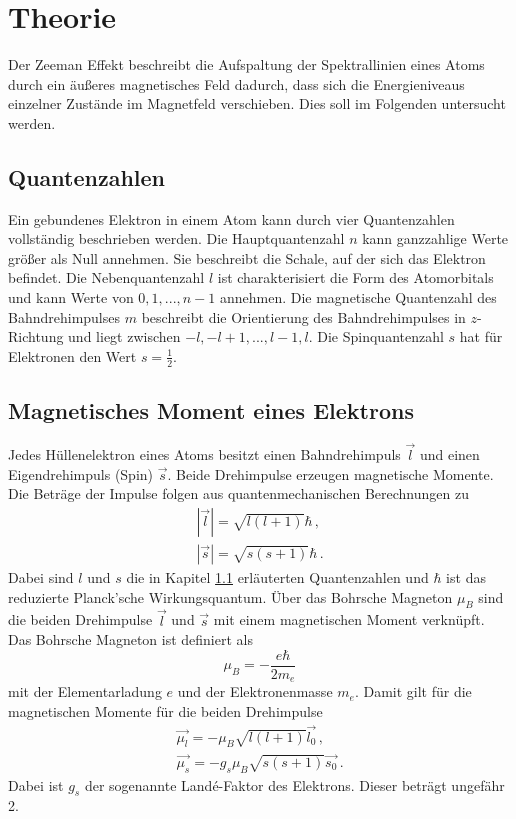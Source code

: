\section{Theorie}
\label{sec:theorie}
Der Zeeman Effekt beschreibt die Aufspaltung der Spektrallinien eines Atoms
durch ein äußeres magnetisches Feld dadurch, dass sich die Energieniveaus einzelner
Zustände im Magnetfeld verschieben. Dies soll im Folgenden untersucht werden.

\subsection{Quantenzahlen}
\label{subsec:quanten}

Ein gebundenes Elektron in einem Atom kann durch vier Quantenzahlen vollständig beschrieben werden.
Die Hauptquantenzahl $n$ kann ganzzahlige Werte größer als Null annehmen. Sie beschreibt die Schale, auf der sich das Elektron befindet. Die Nebenquantenzahl
$l$ ist charakterisiert die Form des Atomorbitals und kann Werte von $0,1,...,n-1$ annehmen. Die magnetische Quantenzahl des Bahndrehimpulses
$m$ beschreibt die Orientierung des Bahndrehimpulses in $z$-Richtung und liegt zwischen $-l, -l+1,..., l-1, l$.
Die Spinquantenzahl $s$ hat für
Elektronen den Wert $s=\frac{1}{2}$.

\subsection{Magnetisches Moment eines Elektrons}
Jedes Hüllenelektron eines Atoms besitzt einen Bahndrehimpuls $\vec{l}$ und einen
Eigendrehimpuls (Spin) $\vec{s}$. Beide Drehimpulse erzeugen magnetische Momente.
Die Beträge der Impulse folgen aus quantenmechanischen Berechnungen zu
\begin{align}
  |\vec{l}| = \sqrt{l(l+1)} \hbar  \,, \\
  |\vec{s}| = \sqrt{s(s+1)} \hbar \,.
\end{align}
Dabei sind $l$ und $s$ die in Kapitel \ref{subsec:quanten} erläuterten Quantenzahlen und
$\hbar$ ist das reduzierte Planck'sche Wirkungsquantum.
Über das Bohrsche Magneton $\mu_B$
sind die beiden Drehimpulse $\vec{l}$ und $\vec{s}$ mit einem magnetischen Moment
verknüpft. Das Bohrsche Magneton ist definiert als
\begin{equation}
  \mu_B = -\frac{e \hbar}{2 m_e}
\end{equation}
mit der Elementarladung $e$ und der Elektronenmasse $m_e$.
Damit gilt für die magnetischen Momente für die beiden Drehimpulse
\begin{align}
  \vec{\mu_l} = -\mu_B \sqrt{l(l+1)} \vec{l_0} \,, \\
  \vec{\mu_s} = -g_s \mu_B \sqrt{s(s+1)} \vec{s_0} \,.
\end{align}
Dabei ist $g_s$ der sogenannte Landé-Faktor des Elektrons. Dieser beträgt ungefähr 2.


